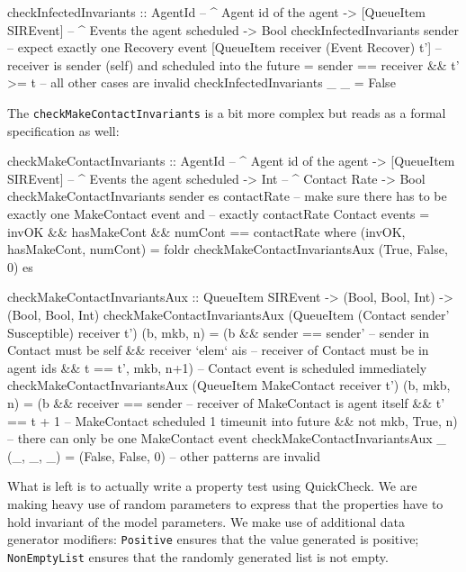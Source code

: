 \begin{HaskellCode}
checkInfectedInvariants :: AgentId              -- ^ Agent id of the agent 
                        -> [QueueItem SIREvent] -- ^ Events the agent scheduled
                        -> Bool
checkInfectedInvariants sender 
  -- expect exactly one Recovery event
  [QueueItem receiver (Event Recover) t'] 
  -- receiver is sender (self) and scheduled into the future
  = sender == receiver && t' >= t 
-- all other cases are invalid
checkInfectedInvariants _ _ = False
\end{HaskellCode}

The \texttt{checkMakeContactInvariants} is a bit more complex but reads as a formal specification as well:

\begin{HaskellCode}
checkMakeContactInvariants :: AgentId              -- ^ Agent id of the agent 
                           -> [QueueItem SIREvent] -- ^ Events the agent scheduled
                           -> Int                  -- ^ Contact Rate
                           -> Bool
checkMakeContactInvariants sender es contactRate
    -- make sure there has to be exactly one MakeContact event and
    -- exactly contactRate Contact events
    = invOK && hasMakeCont && numCont == contactRate
  where
    (invOK, hasMakeCont, numCont) 
      = foldr checkMakeContactInvariantsAux (True, False, 0) es

    checkMakeContactInvariantsAux :: QueueItem SIREvent 
                                  -> (Bool, Bool, Int)
                                  -> (Bool, Bool, Int)
    checkMakeContactInvariantsAux 
        (QueueItem (Contact sender' Susceptible) receiver t') (b, mkb, n)
      = (b && sender == sender'   -- sender in Contact must be self
           && receiver `elem` ais -- receiver of Contact must be in agent ids
           && t == t', mkb, n+1)  -- Contact event is scheduled immediately
    checkMakeContactInvariantsAux 
        (QueueItem MakeContact receiver t') (b, mkb, n) 
      = (b && receiver == sender  -- receiver of MakeContact is agent itself
           && t' == t + 1         -- MakeContact scheduled 1 timeunit into future
           &&  not mkb, True, n)  -- there can only be one MakeContact event
    checkMakeContactInvariantsAux _ (_, _, _) 
      = (False, False, 0)         -- other patterns are invalid
\end{HaskellCode}

What is left is to actually write a property test using QuickCheck. We are making heavy use of random parameters to express that the properties have to hold invariant of the model parameters. We make use of additional data generator modifiers: \texttt{Positive} ensures that the value generated is positive; \texttt{NonEmptyList} ensures that the randomly generated list is not empty.


